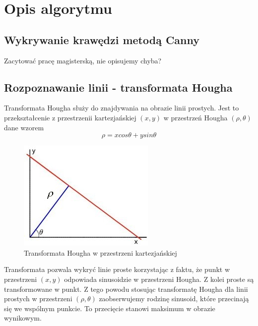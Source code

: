 \section{Opis algorytmu}



\subsection{Wykrywanie krawędzi metodą Canny}

Zacytować pracę magisterską, nie opisujemy chyba?

\subsection{Rozpoznawanie linii - transformata Hougha}

Transformata Hougha służy do znajdywania na obrazie linii prostych. Jest to przekształcenie z przestrzenii kartezjańskiej $(x,y)$ w przestrzeń Hougha $(\rho, \theta)$ dane wzorem
\begin{equation}
\rho = x cos \theta + y sin \theta
\end{equation}

\begin{figure}[!htb]
  \begin{center}
    \includegraphics[scale=1]{img/hough-line.jpg}
    \caption{Transformata Hougha w przestrzeni kartezjańskiej}
  \end{center}
  
  \label{rys:maglev}
\end{figure}

Transformata pozwala wykryć linie proste korzystając z faktu, że punkt w przestrzeni $(x,y)$ odpowiada sinusoidzie w przestrzeni Hougha. Z kolei proste są transformowane w punkt. Z tego powodu stosując transformatę Hougha dla linii prostych w przestrzeni $(\rho, \theta)$ zaobserwujemy rodzinę sinusoid, które przecinają się we wspólnym punkcie. To przecięcie stanowi maksimum w obrazie wynikowym.



